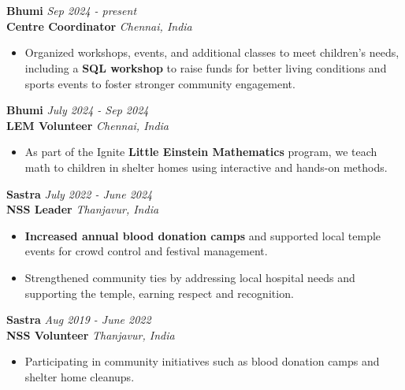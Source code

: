 \documentclass[a4paper,10pt]{article}
\begin{document}
\section{\scshape\color{Fuchsia}{\faHandsHelping\ \textbf VOLUNTEERING \& EXTRACURRICULAR}}
\textbf{Bhumi} \href{https://www.bhumi.ngo/}{} \hfill \textit{Sep 2024 - present} \\
\textbf{Centre Coordinator} \hfill \textit{Chennai, India}
\vspace{-2mm}
\begin{itemize}
    \item Organized workshops, events, and additional classes to meet children's needs, including a \textbf{SQL workshop} to raise funds for better living conditions and sports events to foster stronger community engagement.
\end{itemize}
\vspace{-2mm}
\textbf{Bhumi} \hfill \textit{July 2024 - Sep 2024} \\
\textbf{LEM Volunteer} \hfill \textit{Chennai, India}
\vspace{-2mm}
\begin{itemize}
    \item As part of the Ignite \textbf{Little Einstein Mathematics} program, we teach math to children in shelter homes using interactive and hands-on methods.
\end{itemize}
\vspace{-2mm}
\textbf{Sastra} \hfill \textit{July 2022 - June 2024} \\
\textbf{NSS Leader} \hfill \textit{Thanjavur, India}
\vspace{-2mm}
\begin{itemize}
    \item \textbf{Increased annual blood donation camps} and supported local temple events for crowd control and festival management.
    \vspace{-2mm}
    \item Strengthened community ties by addressing local hospital needs and supporting the temple, earning respect and recognition.
\end{itemize}
\vspace{-2mm}
\textbf{Sastra} \hfill \textit{Aug 2019 - June 2022} \\
\textbf{NSS Volunteer} \hfill \textit{Thanjavur, India}
\vspace{-2mm}
\begin{itemize}
    \item Participating in community initiatives such as blood donation camps and shelter home cleanups.
\end{itemize}
\end{document}
